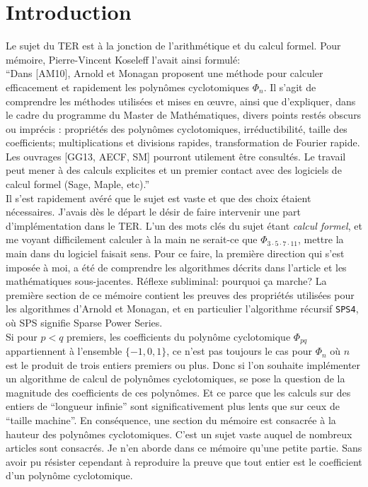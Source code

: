 \documentclass{article}
\newcounter{question}
\theoremstyle{break}                  %
\begin{document}
\section*{Introduction}
Le sujet du TER est à la jonction de l'arithmétique et du calcul formel. Pour mémoire, Pierre-Vincent Koseleff l'avait ainsi formulé:\\

\enquote{Dans [AM10], Arnold et Monagan proposent une méthode pour calculer efficacement et rapidement les polynômes cyclotomiques $\Phi_n$.
	Il s’agit de comprendre les méthodes utilisées et mises en œuvre, ainsi que d’expliquer, dans le cadre du programme du Master de Mathématiques, divers points restés obscurs ou imprécis : propriétés des polynômes cyclotomiques, irréductibilité, taille des coefficients; multiplications et divisions rapides, transformation de Fourier rapide.
	Les ouvrages [GG13, AECF, SM] pourront utilement être consultés. Le travail peut mener à des calculs explicites et un premier contact avec des logiciels de calcul formel (Sage, Maple, etc).}\\

Il s'est rapidement avéré que le sujet est vaste et que des choix étaient nécessaires. J'avais dès le départ le désir de faire intervenir une part d'implémentation dans le TER. L'un des mots clés du sujet étant \emph{calcul formel}, et me voyant difficilement calculer à la main ne serait-ce que $\Phi_{3 \cdot 5 \cdot 7 \cdot 11}$, mettre la main dans du logiciel faisait sens. Pour ce faire, la première direction qui s'est imposée à moi, a été de comprendre les algorithmes décrits dans l'article et les mathématiques sous-jacentes. Réflexe subliminal: pourquoi ça marche?  La première section de ce mémoire contient les preuves des propriétés utilisées pour les algorithmes d'Arnold et Monagan, et en particulier l'algorithme récursif \texttt{SPS4}, où SPS signifie Sparse Power Series.\\

Si pour $p < q$ premiers, les coefficients du polynôme cyclotomique $\Phi_{pq}$ appartiennent à l'ensemble $\{-1, 0, 1\}$, ce n'est pas toujours le cas pour $\Phi_n$ où $n$ est le produit de trois entiers premiers ou plus. Donc si l'on souhaite implémenter un algorithme de calcul de polynômes cyclotomiques, se pose la question de la magnitude des coefficients de ces polynômes. Et ce parce que les calculs sur des entiers de \enquote{longueur infinie} sont significativement plus lents que sur ceux de \enquote{taille machine}. En conséquence, une section du mémoire est consacrée à la hauteur des polynômes cyclotomiques. C'est un sujet vaste auquel de nombreux articles sont consacrés. Je n'en aborde dans ce mémoire qu'une petite partie. Sans avoir pu résister cependant à reproduire la preuve que tout entier est le coefficient d'un polynôme cyclotomique.\\
\end{document}
